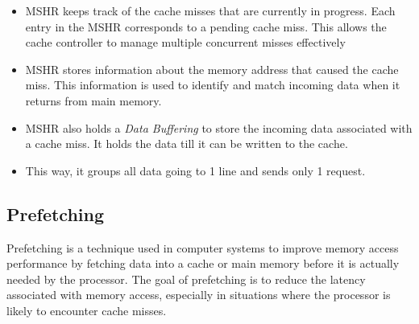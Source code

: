 \documentclass[letterpaper,12pt]{article}
\begin{document}
\begin{itemize}
    \item MSHR keeps track of the cache misses that are currently in progress. Each entry in the MSHR corresponds to a pending cache miss. This allows the cache controller to manage multiple concurrent misses effectively
    \item MSHR stores information about the memory address that caused the cache miss. This information is used to identify and match incoming data when it returns from main memory.
    \item MSHR also holds a \textit{Data Buffering} to store the incoming data associated with a cache miss. It holds the data till it can be written to the cache.
    \item This way, it groups all data going to 1 line and sends only 1 request.
\end{itemize}

\subsection{Prefetching}

Prefetching is a technique used in computer systems to improve memory access performance by fetching data into a cache or main memory before it is actually needed by the processor. The goal of prefetching is to reduce the latency associated with memory access, especially in situations where the processor is likely to encounter cache misses.
\end{document}
